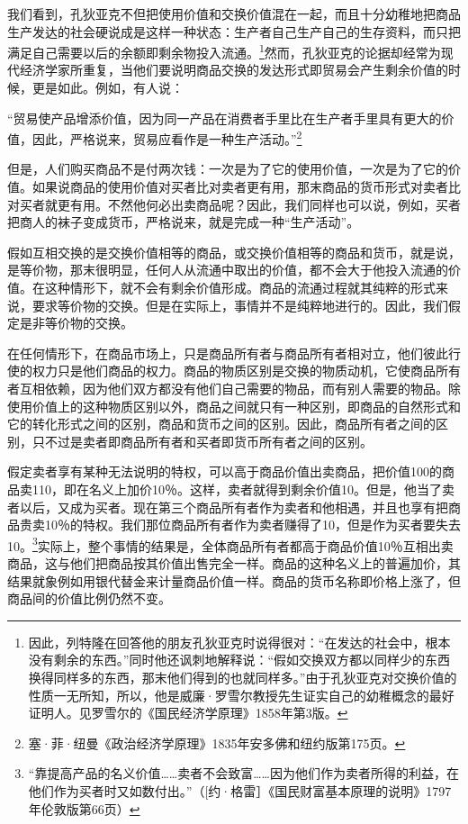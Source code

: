 \documentclass{ctexbook}
\begin{document}
    我们看到，孔狄亚克不但把使用价值和交换价值混在一起，而且十分幼稚地把商品生产发达的社会硬说成是这样一种状态：生产者自己生产自己的生存资料，而只把满足自己需要以后的余额即剩余物投入流通。\footnote{因此，列特隆在回答他的朋友孔狄亚克时说得很对：“在发达的社会中，根本没有剩余的东西。”同时他还讽刺地解释说：“假如交换双方都以同样少的东西换得同样多的东西，那末他们得到的也就同样多。”由于孔狄亚克对交换价值的性质一无所知，所以，他是威廉·罗雪尔教授先生证实自己的幼稚概念的最好证明人。见罗雪尔的《国民经济学原理》1858年第3版。}然而，孔狄亚克的论据却经常为现代经济学家所重复，当他们要说明商品交换的发达形式即贸易会产生剩余价值的时候，更是如此。例如，有人说：

    “贸易使产品增添价值，因为同一产品在消费者手里比在生产者手里具有更大的价值，因此，严格说来，贸易应看作是一种生产活动。”\footnote{塞·菲·纽曼《政治经济学原理》1835年安多佛和纽约版第175页。}

    但是，人们购买商品不是付两次钱：一次是为了它的使用价值，一次是为了它的价值。如果说商品的使用价值对买者比对卖者更有用，那末商品的货币形式对卖者比对买者就更有用。不然他何必出卖商品呢？因此，我们同样也可以说，例如，买者把商人的袜子变成货币，严格说来，就是完成一种“生产活动”。

    假如互相交换的是交换价值相等的商品，或交换价值相等的商品和货币，就是说，是等价物，那末很明显，任何人从流通中取出的价值，都不会大于他投入流通的价值。在这种情形下，就不会有剩余价值形成。商品的流通过程就其纯粹的形式来说，要求等价物的交换。但是在实际上，事情并不是纯粹地进行的。因此，我们假定是非等价物的交换。

    在任何情形下，在商品市场上，只是商品所有者与商品所有者相对立，他们彼此行使的权力只是他们商品的权力。商品的物质区别是交换的物质动机，它使商品所有者互相依赖，因为他们双方都没有他们自己需要的物品，而有别人需要的物品。除使用价值上的这种物质区别以外，商品之间就只有一种区别，即商品的自然形式和它的转化形式之间的区别，商品和货币之间的区别。因此，商品所有者之间的区别，只不过是卖者即商品所有者和买者即货币所有者之间的区别。

    假定卖者享有某种无法说明的特权，可以高于商品价值出卖商品，把价值100的商品卖110，即在名义上加价10％。这样，卖者就得到剩余价值10。但是，他当了卖者以后，又成为买者。现在第三个商品所有者作为卖者和他相遇，并且也享有把商品贵卖10％的特权。我们那位商品所有者作为卖者赚得了10，但是作为买者要失去10。\footnote{“靠提高产品的名义价值……卖者不会致富……因为他们作为卖者所得的利益，在他们作为买者时又如数付出。”（[约·格雷］《国民财富基本原理的说明》1797年伦敦版第66页）}实际上，整个事情的结果是，全体商品所有者都高于商品价值10％互相出卖商品，这与他们把商品按其价值出售完全一样。商品的这种名义上的普遍加价，其结果就象例如用银代替金来计量商品价值一样。商品的货币名称即价格上涨了，但商品间的价值比例仍然不变。
\end{document}
